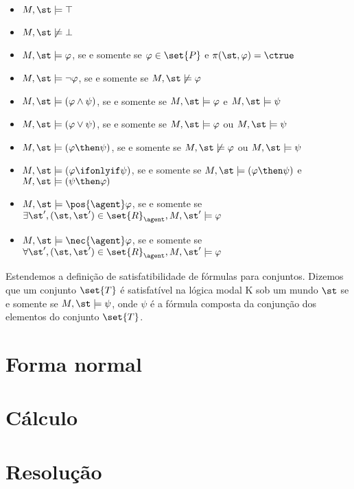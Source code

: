 \begin{itemize}
\item $M,\st \models \top$
\item $M,\st \not\models \bot$
\item $M,\st \models \varphi$, se e somente se $\varphi \in \set{P}$ e $\pi(\st, \varphi) = \ctrue$
\item $M,\st \models \neg\varphi$, se e somente se $M,\st \not\models \varphi$
\item $M,\st \models (\varphi \land \psi)$, se e somente se $M,\st \models \varphi$ e $M,\st \models \psi $
\item $M,\st \models (\varphi \lor \psi)$, se e somente se $M,\st \models \varphi$ ou $M,\st \models \psi $
\item $M,\st \models (\varphi \then \psi)$, se e somente se $M,\st \not\models \varphi$ ou $M,\st \models \psi $
\item $M,\st \models (\varphi \ifonlyif \psi)$, se e somente se $M,\st \models (\varphi \then \psi)$ e $M,\st \models (\psi \then \varphi)$

\item $M,\st \models \pos{\agent}\varphi$, se e somente se $\exists\st', (\st, \st') \in \set{R}_\agent, M,\st' \models \varphi$
\item $M,\st \models \nec{\agent}\varphi$, se e somente se $\forall\st', (\st, \st') \in \set{R}_\agent, M,\st' \models \varphi$

\end{itemize}

Estendemos a definição de satisfatibilidade de fórmulas para conjuntos. Dizemos que um conjunto $\set{T}$ é satisfatível na lógica modal K sob um mundo $\st$ se e somente se $M,\st \models \psi$, onde $\psi$ é a fórmula composta da conjunção dos elementos do conjunto $\set{T}$.


\section{Forma normal}
\section{Cálculo}
\section{Resolução}

